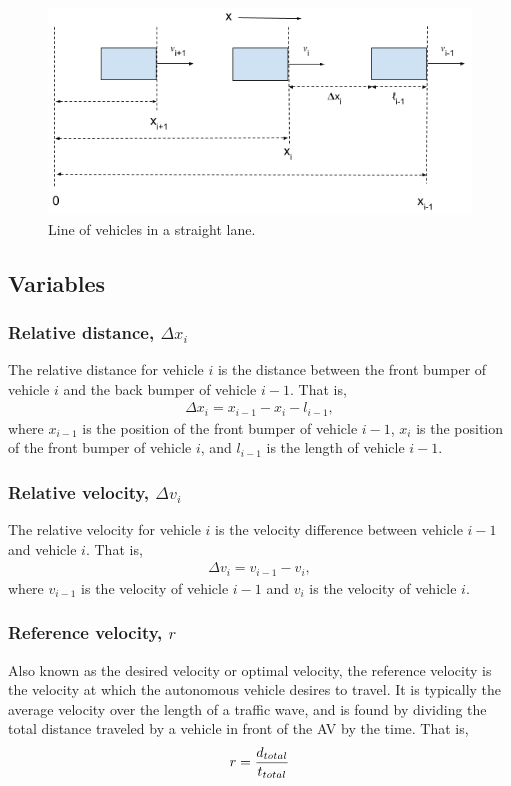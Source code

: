 \documentclass[conference]{IEEEtran}
\begin{document}
\begin{figure}[htbp]
\centerline{\includegraphics[width=3.75 in]{carLane.png}}
\caption{Line of vehicles in a straight lane.}
\label{fig1}
\end{figure}

\subsection{Variables}
\subsubsection{Relative distance, $\Delta x_i$} 
The relative distance for vehicle $i$ is the distance between the front bumper of vehicle $i$ and the back bumper of vehicle $i-1$. That is,
\begin{eqnarray}
\Delta x_i = x_{i-1}-x_i-l_{i-1},
\end{eqnarray}
where $x_{i-1}$ is the position of the front bumper of vehicle $i-1$, $x_i$ is the position of the front bumper of vehicle $i$, and $l_{i-1}$ is the length of vehicle $i-1$.
\subsubsection{Relative velocity, $\Delta v_i$}
The relative velocity for vehicle $i$ is the velocity difference between vehicle $i-1$ and vehicle $i$. That is,
\begin{eqnarray}
\Delta v_i=v_{i-1}-v_i,
\end{eqnarray}
where $v_{i-1}$ is the velocity of vehicle $i-1$ and $v_i$ is the velocity of vehicle $i$.
\subsubsection{Reference velocity, $r$}
Also known as the desired velocity or optimal velocity, the reference velocity is the velocity at which the autonomous vehicle desires to travel. It is typically the average velocity over the length of a traffic wave, and is found by dividing the total distance traveled by a vehicle in front of the AV by the time. That is,
\begin{eqnarray}
r={d_{total}\over t_{total}}
\end{eqnarray}
\end{document}

